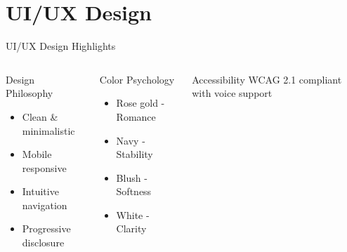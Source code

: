 \documentclass[aspectratio=169]{beamer}
\begin{document}
\section{UI/UX Design}
\begin{frame}{UI/UX Design Highlights}
    \begin{columns}[T]
        \begin{block}{Design Philosophy}
            \begin{itemize}
                \item \textcolor{googleblue}{Clean \& minimalistic}
                \item \textcolor{googlegreen}{Mobile responsive}
                \item \textcolor{googlered}{Intuitive navigation}
                \item \textcolor{googleyellow}{Progressive disclosure}
            \end{itemize}
        \end{block}
        
        \begin{block}{Color Psychology}
            \begin{itemize}
                \item Rose gold - Romance
                \item Navy - Stability
                \item Blush - Softness
                \item White - Clarity
            \end{itemize}
        \end{block}
        
        \begin{center}
            \vspace{0.3cm}
            \begin{alertblock}{Accessibility}
                WCAG 2.1 compliant with voice support
            \end{alertblock}
        \end{center}
    \end{columns}
\end{frame}
\end{document}
